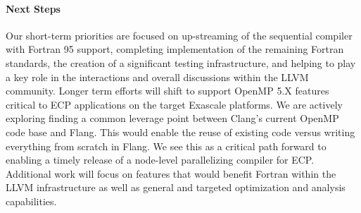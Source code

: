 \paragraph{Next Steps}
Our short-term priorities are focused on up-streaming of the
sequential compiler with Fortran 95 support, completing implementation of the remaining Fortran standards,
the creation of a significant testing infrastructure, and helping to play a key role in
the interactions and overall discussions within the LLVM community.  Longer term efforts
will shift to support OpenMP 5.X features critical to ECP applications
on the target Exascale platforms.  We are actively exploring finding a
common leverage point between Clang's current OpenMP code base and
Flang.  This would enable the reuse of existing code versus writing
everything from scratch in Flang.  We see this as a critical path
forward to enabling a timely release of a node-level parallelizing
compiler for ECP.  Additional work will focus on features that would
benefit Fortran within the LLVM infrastructure as well as general and
targeted optimization and analysis capabilities.

